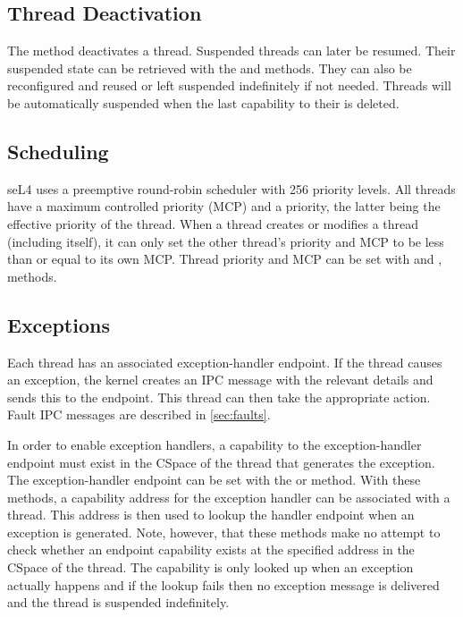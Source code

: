 \subsection{Thread Deactivation}
\label{sec:thread_deactivation}

The  method deactivates a thread.
Suspended threads can later be resumed.
Their suspended state can be retrieved with the
 and
 methods.
They can also be reconfigured and
reused or left suspended indefinitely if not needed. Threads will be
automatically suspended when the last capability to their  is
deleted.

\subsection{Scheduling}
\label{sec:sched}

seL4 uses a preemptive round-robin scheduler with 256 priority levels.
All threads have a maximum controlled priority (MCP) and a priority, the latter being the effective
priority of the thread.
When a thread creates or modifies a thread (including itself), it can only set the
other thread's priority and MCP to be less than or equal to its own MCP. Thread priority and MCP can be
set with  and
,  methods.

\subsection{Exceptions}

Each thread has an associated exception-handler endpoint. If the thread
causes an exception, the kernel creates an IPC message with the relevant
details and sends this to the endpoint. This
thread can then take the appropriate action. Fault IPC messages are
described in \autoref{sec:faults}.

In order to enable exception handlers, a capability to the exception-handler
endpoint must exist in the CSpace of the thread that generates the exception.
The exception-handler
endpoint can be set with the  or
 method.
With these methods, a capability address for the exception handler can be associated with a thread.
This address is then used to lookup the handler endpoint when an exception is generated.
Note, however, that these methods make no attempt to check whether an endpoint capability exists at the specified
address in the CSpace of the thread. The capability is only looked up
when an exception actually happens and if the lookup fails then no
exception message is delivered and the thread is suspended indefinitely.

